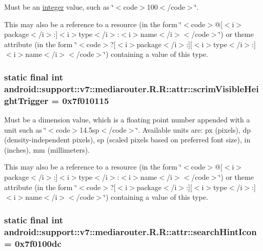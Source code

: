 Must be an \hyperlink{classandroid_1_1support_1_1v7_1_1mediarouter_1_1_r_1_1integer}{integer} value, such as \char`\"{}$<$code$>$100$<$/code$>$\char`\"{}. 

This may also be a reference to a resource (in the form \char`\"{}$<$code$>$@\mbox{[}$<$i$>$package$<$/i$>$:\mbox{]}$<$i$>$type$<$/i$>$:$<$i$>$name$<$/i$>$$<$/code$>$\char`\"{}) or theme attribute (in the form \char`\"{}$<$code$>$?\mbox{[}$<$i$>$package$<$/i$>$:\mbox{]}\mbox{[}$<$i$>$type$<$/i$>$:\mbox{]}$<$i$>$name$<$/i$>$$<$/code$>$\char`\"{}) containing a value of this type. \hypertarget{classandroid_1_1support_1_1v7_1_1mediarouter_1_1_r_1_1attr_beffb85734a1b5db6ee180e7df96cdb3}{
\subsubsection[{scrimVisibleHeightTrigger}]{\setlength{\rightskip}{0pt plus 5cm}static final int android::support::v7::mediarouter.R.R::attr::scrimVisibleHeightTrigger = 0x7f010115}}
\label{classandroid_1_1support_1_1v7_1_1mediarouter_1_1_r_1_1attr_beffb85734a1b5db6ee180e7df96cdb3}


Must be a dimension value, which is a floating point number appended with a unit such as \char`\"{}$<$code$>$14.5sp$<$/code$>$\char`\"{}. Available units are: px (pixels), dp (density-independent pixels), sp (scaled pixels based on preferred font size), in (inches), mm (millimeters). 

This may also be a reference to a resource (in the form \char`\"{}$<$code$>$@\mbox{[}$<$i$>$package$<$/i$>$:\mbox{]}$<$i$>$type$<$/i$>$:$<$i$>$name$<$/i$>$$<$/code$>$\char`\"{}) or theme attribute (in the form \char`\"{}$<$code$>$?\mbox{[}$<$i$>$package$<$/i$>$:\mbox{]}\mbox{[}$<$i$>$type$<$/i$>$:\mbox{]}$<$i$>$name$<$/i$>$$<$/code$>$\char`\"{}) containing a value of this type. \hypertarget{classandroid_1_1support_1_1v7_1_1mediarouter_1_1_r_1_1attr_1875c8a6efc7e209e7bec5462987e9f3}{
\subsubsection[{searchHintIcon}]{\setlength{\rightskip}{0pt plus 5cm}static final int android::support::v7::mediarouter.R.R::attr::searchHintIcon = 0x7f0100dc}}
\label{classandroid_1_1support_1_1v7_1_1mediarouter_1_1_r_1_1attr_1875c8a6efc7e209e7bec5462987e9f3}


